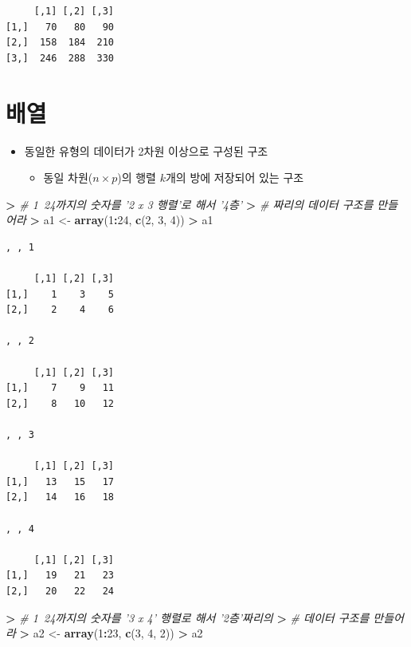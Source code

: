 \documentclass[12pt,a4paper]{book}
\newenvironment{Shaded}{\begin{snugshade}}{\end{snugshade}}
\newcommand{\KeywordTok}[1]{\textcolor[rgb]{0.13,0.29,0.53}{\textbf{#1}}}
\newcommand{\DecValTok}[1]{\textcolor[rgb]{0.00,0.00,0.81}{#1}}
\newcommand{\StringTok}[1]{\textcolor[rgb]{0.31,0.60,0.02}{#1}}
\newcommand{\CommentTok}[1]{\textcolor[rgb]{0.56,0.35,0.01}{\textit{#1}}}
\newcommand{\OperatorTok}[1]{\textcolor[rgb]{0.81,0.36,0.00}{\textbf{#1}}}
\newcommand{\ErrorTok}[1]{\textcolor[rgb]{0.64,0.00,0.00}{\textbf{#1}}}
\newcommand{\NormalTok}[1]{#1}
\providecommand{\tightlist}{%
  \setlength{\itemsep}{0pt}\setlength{\parskip}{0pt}}
\theoremstyle{definition}
\theoremstyle{definition}
\theoremstyle{definition}
\theoremstyle{remark}
\begin{document}
\begin{verbatim}
     [,1] [,2] [,3]
[1,]   70   80   90
[2,]  158  184  210
[3,]  246  288  330
\end{verbatim}

\section{배열}

\begin{itemize}
\tightlist
\item
  동일한 유형의 데이터가 2차원 이상으로 구성된 구조

  \begin{itemize}
  \tightlist
  \item
    동일 차원(\(n\times p\))의 행렬 \(k\)개의 방에 저장되어 있는 구조
  \end{itemize}
\end{itemize}

\begin{Shaded}
\begin{Highlighting}[]
\OperatorTok{>}\StringTok{ }\CommentTok{# 1~24까지의 숫자를 '2 x 3 행렬'로 해서 '4층'}
\ErrorTok{>}\StringTok{ }\CommentTok{# 짜리의 데이터 구조를 만들어라}
\ErrorTok{>}\StringTok{ }\NormalTok{a1 <-}\StringTok{ }\KeywordTok{array}\NormalTok{(}\DecValTok{1}\OperatorTok{:}\DecValTok{24}\NormalTok{, }\KeywordTok{c}\NormalTok{(}\DecValTok{2}\NormalTok{, }\DecValTok{3}\NormalTok{, }\DecValTok{4}\NormalTok{))}
\OperatorTok{>}\StringTok{ }\NormalTok{a1}
\end{Highlighting}
\end{Shaded}

\begin{verbatim}
, , 1

     [,1] [,2] [,3]
[1,]    1    3    5
[2,]    2    4    6

, , 2

     [,1] [,2] [,3]
[1,]    7    9   11
[2,]    8   10   12

, , 3

     [,1] [,2] [,3]
[1,]   13   15   17
[2,]   14   16   18

, , 4

     [,1] [,2] [,3]
[1,]   19   21   23
[2,]   20   22   24
\end{verbatim}

\begin{Shaded}
\begin{Highlighting}[]
\OperatorTok{>}\StringTok{ }\CommentTok{# 1~24까지의 숫자를 '3 x 4' 행렬로 해서 '2층'짜리의}
\ErrorTok{>}\StringTok{ }\CommentTok{# 데이터 구조를 만들어라}
\ErrorTok{>}\StringTok{ }\NormalTok{a2 <-}\StringTok{ }\KeywordTok{array}\NormalTok{(}\DecValTok{1}\OperatorTok{:}\DecValTok{23}\NormalTok{, }\KeywordTok{c}\NormalTok{(}\DecValTok{3}\NormalTok{, }\DecValTok{4}\NormalTok{, }\DecValTok{2}\NormalTok{))}
\OperatorTok{>}\StringTok{ }\NormalTok{a2}
\end{Highlighting}
\end{Shaded}
\end{document}
